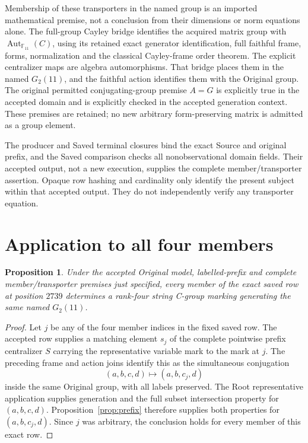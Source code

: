 \documentclass[11pt]{article}
\newtheorem{proposition}[lemma]{Proposition}
\begin{document}
Membership of these transporters in the named group is an imported
mathematical premise, not a conclusion from their dimensions or norm
equations alone.  The full-group Cayley bridge identifies the acquired
matrix group with $\operatorname{Aut}_{\mathbb F_{11}}(C)$, using its
retained exact generator identification, full faithful frame, forms,
normalization and the classical Cayley-frame order theorem.  The explicit
centralizer maps are algebra automorphisms.  That bridge places them in
the named $G_2(11)$, and the faithful action identifies them with the
Original group.  The original permitted conjugating-group premise
$A=G$ is explicitly true in the accepted domain and is explicitly
checked in the accepted generation context.  These premises are retained;
no new arbitrary form-preserving matrix is admitted as a group element.

The producer and Saved terminal closures bind the exact Source and
original prefix, and the Saved comparison checks all nonobservational
domain fields.  Their accepted output, not a new execution, supplies the
complete member/transporter assertion.  Opaque row hashing and cardinality
only identify the present subject within that accepted output.  They do
not independently verify any transporter equation.

\section*{Application to all four members}

\begin{proposition}
Under the accepted Original model, labelled-prefix and complete
member/transporter premises just specified, every member of the exact
saved row at position $2739$ determines a rank-four string C-group
marking generating the same named $G_2(11)$.
\end{proposition}
\begin{proof}
Let $j$ be any of the four member indices in the fixed saved row.
The accepted row supplies a matching element $s_j$ of the complete
pointwise prefix centralizer $S$ carrying the representative variable
mark to the mark at $j$.  The preceding frame and action joins identify
this as the simultaneous conjugation
\[
                 (a,b,c,d)\longmapsto(a,b,c_j,d)
\]
inside the same Original group, with all labels preserved.  The Root
representative application supplies generation and the full subset
intersection property for $(a,b,c,d)$.  Proposition~\ref{prop:prefix}
therefore supplies both properties for $(a,b,c_j,d)$.  Since $j$ was
arbitrary, the conclusion holds for every member of this exact row.
\end{proof}
\end{document}
